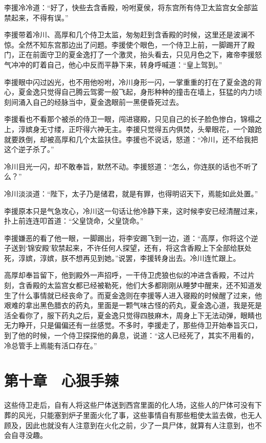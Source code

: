 李援冷冷道：“好了，快些去含香殿，吩咐夏侯，将东宫所有侍卫太监宫女全部监禁起来，不得有误。”

李援带着冷川、高厚和几个侍卫太监，匆匆赶到含香殿的时候，这里还是波澜不惊。全然不知东宫那边出了问题。李援使个眼色，一个侍卫上前，一脚踢开了殿门，正在前面守卫的夏金逸打了一个激灵，抬头看去，只见月色之下，雍帝李援怒气冲冲的盯着自己，他心中反而平静下来，转身呼喊道：“皇上驾到。”

李援眼中闪过凶光，也不用他吩咐，冷川身形一闪，一掌重重的打在了夏金逸的背心，夏金逸只觉得自己腾云驾雾一般飞起，身形种种的撞击在墙上，狂猛的内力顷刻间涌入自己的经脉当中，夏金逸眼前一黑便昏死过去。

李援看也不看那个被杀的侍卫一眼，闯进寝殿，只见自己的长子脸色惨白，锦榻之上，淳嫔身无寸缕，正吓得六神无主。李援只觉得五内俱焚，头晕眼花，一个踉跄就要跌倒，却被高厚和几个太监扶住。李援也不说话，怒道：“冷川，还不给我把这个逆子杀了。”

冷川目光一闪，却不敢奉旨，默然不动。李援怒道：“怎么，你连朕的话也不听了么？”

冷川淡淡道：“陛下，太子乃是储君，就是有罪，也得明诏天下，焉能如此处置。”

李援原本只是气急攻心，冷川这一句话让他冷静下来，这时候李安已经清醒过来，扑上前连连叩首道：“父皇饶命，父皇饶命。”

李援嫌恶的看了他一眼，一脚踢出，将李安踢飞到一边，道：“高厚，你将这个逆子送到‘锦安殿’软禁起来，不许任何人探望，还有，将这含香殿上下全部给朕处死，淳嫔，淳嫔，朕不想再见到她。”说罢，李援转身出去。冷川连忙跟上。

高厚却奉旨留下，他到殿外一声招呼，一干侍卫虎狼也似的冲进含香殿，不过片刻，含香殿的太监宫女都已经被勒死，他们大多都刚刚从睡梦中醒来，还不知道发生了什么事情就已经丧命了。而夏金逸则在李援等人进入寝殿的时候醒了过来，他艰难的拿出黑色腊衣的药丸，里面是一颗气味古怪的药丸，夏金逸心道，我是死是活全看你了，服下药丸之后，夏金逸只觉得四肢麻木，周身上下无法动弹，眼睛也无力睁开，只是偏偏还有一丝感觉。不多时，李援走了，那些侍卫开始奉旨灭口，到了他的时候，一个侍卫探探他的鼻息，说道：“这人已经死了，其实不用看的，冷总管手上焉能有活口存在。”

\chapter{第十章　心狠手辣}

这些侍卫走后，自有人将这些尸体送到西宫里面的化人场，这些人的尸体可没有下葬的风光，只能塞到炉子里面火化了事，这些事情自有那些粗使太监去做，也无人顾及，因此也就没有人注意到在火化之前，少了一具尸体，就算有人注意到，也不会自寻没趣。

